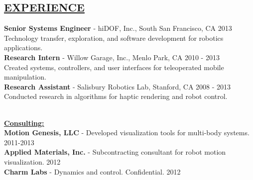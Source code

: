 \documentclass[line,margin]{res}
\newcommand{\CVOnly}[1]{}
\newcommand{\CVOnly}[1]{#1}
\newcommand{\hide}[1]{}
\begin{document}
\begin{resume}
\section{\underline{EXPERIENCE}}
\vspace{1.0pc}
{\bf Senior Systems Engineer} -  hiDOF, Inc., South San Francisco, CA  \hfill 2013
\\[0.0pc]Technology transfer, exploration, and software development for robotics applications.
%
\\[0.4pc]{\bf Research Intern} - Willow Garage, Inc., Menlo Park, CA \hfill 2010 - 2013
\\[0.0pc]Created systems, controllers, and user interfaces for teleoperated mobile manipulation.
%
\\[0.4pc]{\bf Research Assistant} - Salisbury Robotics Lab, Stanford, CA \hfill 2008 - 2013
\\[0.0pc]Conducted research in algorithms for haptic rendering and robot control.
\CVOnly{\\[0.0pc]Implemented miniature stereo camera sensor hardware for a robot gripper.}
%
\CVOnly{
\\[0.4pc]{\bf Electrical Engineering Intern} - Qual-Tron, Inc., Tulsa, OK \hfill 2006 - 2007
\\[0.0pc] Designed and implemented test procedures for IR and magnetic sensor products.
\\[0.0pc]Led redesign of a magnetic sensor product to reduce cost and simplify assembly.}
%
\hide{
\\[0.4pc]{\bf Summer Intern} - Atmel Corporation \hfill 2005
\\[0.4pc]{\bf Summer Research Intern} - NASA Glenn Research Center \hfill 2004%
}
%
\\[0.4pc]{\bf \underline{Consulting:}}
\\[0.2pc]{\bf Motion Genesis, LLC} - Developed visualization tools for multi-body systems. \hfill 2011-2013
\\[0.0pc]{\bf Applied Materials, Inc.} - Subcontracting consultant for robot motion visualization. \hfill 2012
\\[0.0pc]{\bf Charm Labs} - Dynamics and control. Confidential. \hfill 2012
%

%
%

\end{resume}
\end{document}
